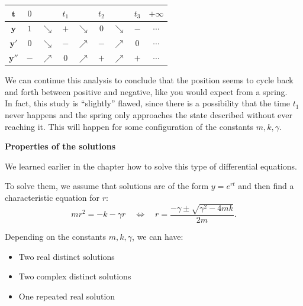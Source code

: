 \begin{graybox}
\begin{center}
\begin{tabular}{c||c|c|c|c|c|c|c|c}
$\pmb{t}$	& $0$ 		& 			& $t_1$ &  			&	$t_2$& 	&$t_3$	& \hspace{1cm} $+\infty$ \\[5pt] \hline\hline
$\pmb{y}$ & $1$	& $ \searrow$	& $+$ &	$\searrow$ 	& $0$	&  $\searrow$ 	& $-$ 	& $\cdots$	\\[5pt] \hline
$\pmb{y'}$ & $0$ &	$\searrow$	& $-$ & $\nearrow$ & $-$	&  $\nearrow$	& $0$ &	$\cdots$ \\[5pt] \hline
$\pmb{y''}$ & $-$		& $\nearrow$ & 0  & $\nearrow$  & $+$ & $\nearrow$	& $+$ &	$ \cdots$ \\[5pt] \hline
\end{tabular}
\end{center}
\end{graybox}

We can continue this analysis to conclude that the position seems to cycle back and forth between positive and negative, like you would expect from a spring. \\

In fact, this study is ``slightly'' flawed, since there is a possibility that the time $t_1$ never happens and the spring only approaches the state described without ever reaching it. This will happen for some configuration of the constants $m,k,\gamma$.




\hfill

\begin{center}
\textbf{\color{cyan}
Properties of the solutions
}
\end{center}



We learned earlier in the chapter how to solve this type of differential equations.

To solve them, we assume that solutions are of the form $y=e^{rt}$ and then find a characteristic equation for $r$:
$$
mr^2 = -k - \gamma r
\quad \Leftrightarrow \quad 
r = \frac{-\gamma \pm \sqrt{\gamma^2 - 4mk}}{2m}.
$$

Depending on the constants $m, k, \gamma$, we can have:
\begin{itemize}
	\item Two real distinct solutions 
	\item Two complex distinct solutions
	\item One repeated real solution
\end{itemize}

